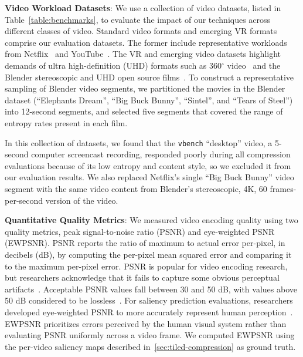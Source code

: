 \noindent \textbf{Video Workload Datasets}: We use a collection of video datasets, listed in Table~\ref{table:benchmarks}, to evaluate the impact of our techniques across different classes of video.
Standard video formats and emerging VR formats comprise our evaluation datasets.
The former include representative workloads from Netflix~\cite{netflix2016data} and YouTube~\cite{vbench}.
The VR and emerging video datasets highlight demands of ultra high-definition (UHD) formats such as 360$^\circ$ video~\cite{saliency-map} and the Blender stereoscopic and UHD open source films~\cite{blender}.
To construct a representative sampling of Blender video segments, we partitioned the movies in the Blender dataset (``Elephants Dream'', ``Big Buck Bunny'', ``Sintel'', and ``Tears of Steel'') into 12-second segments, and selected five segments that covered the range of entropy rates present in each film.

\benchmarkInformationFigure

In this collection of datasets, we found that the \texttt{vbench} ``desktop'' video, a 5-second computer screencast recording, responded poorly during all compression evaluations because of its low entropy and content style, so we excluded it from our evaluation results.
We also replaced Netflix's single ``Big Buck Bunny'' video segment with the same video content from Blender's stereoscopic, 4K, 60 frames-per-second version of the video.

\noindent \textbf{Quantitative Quality Metrics}:
We measured video encoding quality using two quality metrics, peak signal-to-noise ratio (PSNR) and eye-weighted PSNR (EWPSNR).
PSNR reports the ratio of maximum to actual error per-pixel, in decibels (dB), by computing the per-pixel mean squared error and comparing it to the maximum per-pixel error.
PSNR is popular for video encoding research, but researchers acknowledge that it fails to capture some obvious perceptual artifacts~\cite{netflix2016data}.
Acceptable PSNR values fall between 30 and 50 dB, with values above 50 dB considered to be lossless~\cite{vbench}.
For saliency prediction evaluations, researchers developed eye-weighted PSNR to more accurately represent human perception~\cite{li2011visual}.
EWPSNR prioritizes errors perceived by the human visual system rather than evaluating PSNR uniformly across a video frame.
We computed EWPSNR using the per-video saliency maps described in~\ref{sec:tiled-compression} as ground truth.

